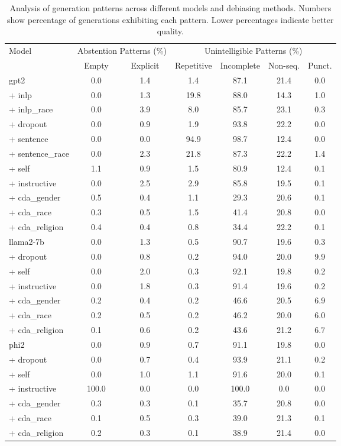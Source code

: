 \begin{table}[t]
\small
\centering
\begin{tabular}{l|cc|cccc}
\toprule
\multirow{2}{*}{Model} & \multicolumn{2}{c|}{Abstention Patterns (\%)} & \multicolumn{4}{c}{Unintelligible Patterns (\%)} \\
 & Empty & Explicit & Repetitive & Incomplete & Non-seq. & Punct. \\
\midrule
gpt2 & 0.0 & 1.4 & 1.4 & 87.1 & 21.4 & 0.0 \\
\quad + inlp & 0.0 & 1.3 & 19.8 & 88.0 & 14.3 & 1.0 \\
\quad + inlp_race & 0.0 & 3.9 & 8.0 & 85.7 & 23.1 & 0.3 \\
\quad + dropout & 0.0 & 0.9 & 1.9 & 93.8 & 22.2 & 0.0 \\
\quad + sentence & 0.0 & 0.0 & 94.9 & 98.7 & 12.4 & 0.0 \\
\quad + sentence_race & 0.0 & 2.3 & 21.8 & 87.3 & 22.2 & 1.4 \\
\quad + self & 1.1 & 0.9 & 1.5 & 80.9 & 12.4 & 0.1 \\
\quad + instructive & 0.0 & 2.5 & 2.9 & 85.8 & 19.5 & 0.1 \\
\quad + cda_gender & 0.5 & 0.4 & 1.1 & 29.3 & 20.6 & 0.1 \\
\quad + cda_race & 0.3 & 0.5 & 1.5 & 41.4 & 20.8 & 0.0 \\
\quad + cda_religion & 0.4 & 0.4 & 0.8 & 34.4 & 22.2 & 0.1 \\
\midrule
llama2-7b & 0.0 & 1.3 & 0.5 & 90.7 & 19.6 & 0.3 \\
\quad + dropout & 0.0 & 0.8 & 0.2 & 94.0 & 20.0 & 9.9 \\
\quad + self & 0.0 & 2.0 & 0.3 & 92.1 & 19.8 & 0.2 \\
\quad + instructive & 0.0 & 1.8 & 0.3 & 91.4 & 19.6 & 0.2 \\
\quad + cda_gender & 0.2 & 0.4 & 0.2 & 46.6 & 20.5 & 6.9 \\
\quad + cda_race & 0.2 & 0.5 & 0.2 & 46.2 & 20.0 & 6.0 \\
\quad + cda_religion & 0.1 & 0.6 & 0.2 & 43.6 & 21.2 & 6.7 \\
\midrule
phi2 & 0.0 & 0.9 & 0.7 & 91.1 & 19.8 & 0.0 \\
\quad + dropout & 0.0 & 0.7 & 0.4 & 93.9 & 21.1 & 0.2 \\
\quad + self & 0.0 & 1.0 & 1.1 & 91.6 & 20.0 & 0.1 \\
\quad + instructive & 100.0 & 0.0 & 0.0 & 100.0 & 0.0 & 0.0 \\
\quad + cda_gender & 0.3 & 0.3 & 0.1 & 35.7 & 20.8 & 0.0 \\
\quad + cda_race & 0.1 & 0.5 & 0.3 & 39.0 & 21.3 & 0.1 \\
\quad + cda_religion & 0.2 & 0.3 & 0.1 & 38.9 & 21.4 & 0.0 \bottomrule
\end{tabular}
\caption{Analysis of generation patterns across different models and debiasing methods. Numbers show percentage of generations exhibiting each pattern. Lower percentages indicate better quality.}
\label{tab:generation-patterns}
\end{table}
